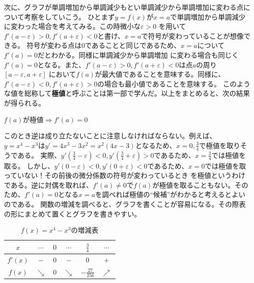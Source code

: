 \documentclass[a4j,dvipdfmx]{jsarticle}
\begin{document}
                    次に、グラフが単調増加から単調減少もとい単調減少から単調増加に変わる点について考察をしていこう。
                    ひとまず$y=f(x)$が$x=a$で単調増加から単調減少に変わった場合を考えてみる。この時微小な$\varepsilon>0$
                    を用いて$f'(a-\varepsilon)>0,f'(a+\varepsilon)<0$と書け、$x=a$で符号が変わっていることが想像できる。
                    符号が変わる点は$0$であることと同じであるため、$x=a$について$f'(a)=0$だとわかる。同様に単調減少から単調増加
                    に変わる場合も同じく$f'(a)=0$となる。また、$f'(a-\varepsilon)>0,f'(a+\varepsilon)<0$は点$a$の周り$[a-\varepsilon,a+\varepsilon]$
                    において$f(a)$が最大値であることを意味する。同様に、$f'(a-\varepsilon)<0,f'(a+\varepsilon)>0$の場合も最小値であることを意味する。
                    このような値を総称して\textbf{極値}と呼ぶことは第一部で学んだ。以上をまとめると、次の結果が得られる。
                    \begin{screen}\centerline{
                        $f(a)$が極値$\Rightarrow f'(a)=0$}
                    \end{screen}
                    このとき逆は成り立たないことに注意しなければならない。例えば、$y=x^4-x^3$は$y'=4x^3-3x^2=x^2(4x-3)$となるため、$x=0,\frac{3}{4}$で極値を取りそうである。
                    実際、$y'(\frac{3}{4}-\varepsilon)<0,y'(\frac{3}{4}+\varepsilon)>0$であるため、$x=\frac{3}{4}$では極値を取る。
                    しかし、$y'(0-\varepsilon)<0,y'(0+\varepsilon)<0$であるため、$x=0$では極値を取っていない！その前後の微分係数の符号が変わっているとき
                    を極値というわけである。逆に対偶を取れば、$f'(a)\neq 0$で$f(a)$が極値を取ることもない。そのため、$f'(a)=0$となる$x=a$を調べれば極値の``候補''がわかると考えるとよいのである。
                    \clearpage
                    関数の増減を調べると、グラフを書くことが容易になる。その際表の形にまとめて置くとグラフを書きやすい。
                    \begin{table}[h]
                        \centering
                        \begin{tabular}{|c||c|c|c|c|c|}\hline
                            $x$ & $\cdots$ & $0$ & $\cdots$ & $\frac{3}{4}$ & $\cdots$ \\\hline
                            $f'(x)$ & $-$ & $0$ & $-$ & $0$ & $+$ \\\hline
                            $f(x)$ & $\searrow $ & $0$ & $\searrow$ & $-\frac{27}{256}$ & $\nearrow$ \\\hline
                        \end{tabular}
                        \caption{$f(x)=x^4-x^3$の増減表}\label{ta:f(x)=x^4-x^3の増減表}
                    \end{table}
\end{document}
